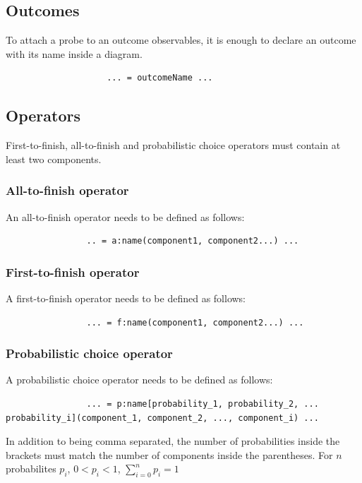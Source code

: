         \subsection{Outcomes}
            To attach a probe to an outcome observables, it is enough to declare an outcome with its name inside a diagram.
                \begin{verbatim}
                    ... = outcomeName ...
                \end{verbatim}
        \subsection{Operators}
            First-to-finish, all-to-finish and probabilistic choice operators must contain at least two components.
              \subsubsection{All-to-finish operator}
            An all-to-finish operator needs to be defined as follows:
            \begin{verbatim}
                .. = a:name(component1, component2...) ...
            \end{verbatim}

        \subsubsection{First-to-finish operator}
            A first-to-finish operator needs to be defined as follows:
            \begin{verbatim}
                ... = f:name(component1, component2...) ...
            \end{verbatim} 

        \subsubsection{Probabilistic choice operator}
            A probabilistic choice operator needs to be defined as follows:
            \begin{verbatim}
                ... = p:name[probability_1, probability_2, ... probability_i](component_1, component_2, ..., component_i) ...
            \end{verbatim}
            In addition to being comma separated, the number of probabilities inside the brackets must match the number of components inside the parentheses. For $n$ probabilites $p_i$, $0 < p_i < 1$, $\sum_{i = 0}^{n} p_i = 1$ 
        
